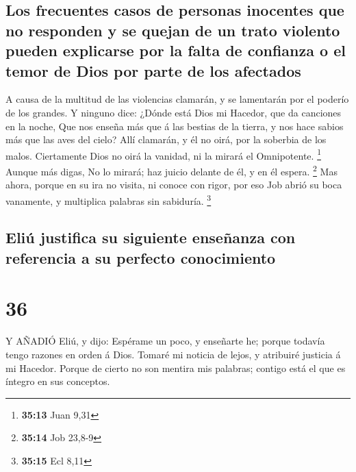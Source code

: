 \hypertarget{los-frecuentes-casos-de-personas-inocentes-que-no-responden-y-se-quejan-de-un-trato-violento-pueden-explicarse-por-la-falta-de-confianza-o-el-temor-de-dios-por-parte-de-los-afectados}{%
\subsection{Los frecuentes casos de personas inocentes que no responden
y se quejan de un trato violento pueden explicarse por la falta de
confianza o el temor de Dios por parte de los
afectados}\label{los-frecuentes-casos-de-personas-inocentes-que-no-responden-y-se-quejan-de-un-trato-violento-pueden-explicarse-por-la-falta-de-confianza-o-el-temor-de-dios-por-parte-de-los-afectados}}

 A causa de la multitud de las violencias clamarán, y se
lamentarán por el poderío de los grandes.  Y ninguno dice:
¿Dónde está Dios mi Hacedor, que da canciones en la noche, 
Que nos enseña más que á las bestias de la tierra, y nos hace sabios más
que las aves del cielo?  Allí clamarán, y él no oirá, por
la soberbia de los malos.  Ciertamente Dios no oirá la
vanidad, ni la mirará el Omnipotente. \footnote{\textbf{35:13} Juan 9,31}
 Aunque más digas, No lo mirará; haz juicio delante de él,
y en él espera. \footnote{\textbf{35:14} Job 23,8-9}  Mas
ahora, porque en su ira no visita, ni conoce con rigor, por eso Job
abrió su boca vanamente, y multiplica palabras sin sabiduría.
\footnote{\textbf{35:15} Ecl 8,11} 

\hypertarget{eliuxfa-justifica-su-siguiente-enseuxf1anza-con-referencia-a-su-perfecto-conocimiento}{%
\subsection{Eliú justifica su siguiente enseñanza con referencia a su
perfecto
conocimiento}\label{eliuxfa-justifica-su-siguiente-enseuxf1anza-con-referencia-a-su-perfecto-conocimiento}}

\hypertarget{section-35}{%
\section{36}\label{section-35}}

 Y AÑADIÓ Eliú, y dijo:  Espérame un poco, y
enseñarte he; porque todavía tengo razones en orden á Dios. 
Tomaré mi noticia de lejos, y atribuiré justicia á mi Hacedor.
 Porque de cierto no son mentira mis palabras; contigo está
el que es íntegro en sus conceptos.

